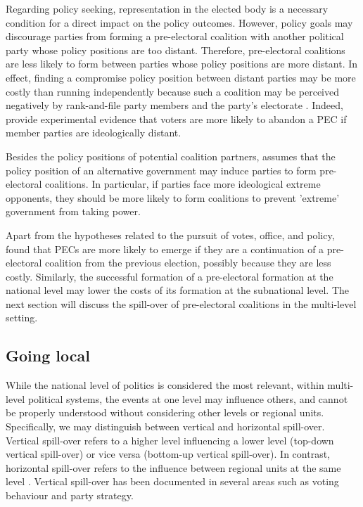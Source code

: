 \documentclass[]{interact}
\theoremstyle{plain}%
\theoremstyle{definition}
\theoremstyle{remark}
\begin{document}
Regarding policy seeking, representation in the elected body is a necessary condition for a direct impact on the policy outcomes. However, policy goals may discourage parties from forming a pre-electoral coalition with another political party whose policy positions are too distant. Therefore, pre-electoral coalitions are less likely to form between parties whose policy positions are more distant. In effect, finding a compromise policy position between distant parties may be more costly than running independently because such a coalition may be perceived negatively by rank-and-file party members and the party's electorate \citep[198]{golder2006b}. Indeed, \citet{gschwend2008} provide experimental evidence that voters are more likely to abandon a PEC if member parties are ideologically distant.

Besides the policy positions of potential coalition partners, \citet{golder2006} assumes that the policy position of an alternative government may induce parties to form pre-electoral coalitions. In particular, if parties face more ideological extreme opponents, they should be more likely to form coalitions to prevent 'extreme' government from taking power.

Apart from the hypotheses related to the pursuit of votes, office, and policy, \citet{ibenskas2016} found that PECs are more likely to emerge if they are a continuation of a pre-electoral coalition from the previous election, possibly because they are less costly. 
Similarly, the successful formation of a pre-electoral formation at the national level may lower the costs of its formation at the subnational level. The next section will discuss the spill-over of pre-electoral coalitions in the multi-level setting.

\subsection{Going local}

While the national level of politics is considered the most relevant, within multi-level political systems, the events at one level may influence others, and cannot be properly understood without considering other levels or regional units. Specifically, we may distinguish between vertical and horizontal spill-over. Vertical spill-over refers to a higher level influencing a lower level (top-down vertical spill-over) or vice versa (bottom-up vertical spill-over). In contrast, horizontal spill-over refers to the influence between regional units at the same level \citep{schakel2021}. Vertical spill-over has been documented in several areas such as voting behaviour and party strategy. 
\end{document}
